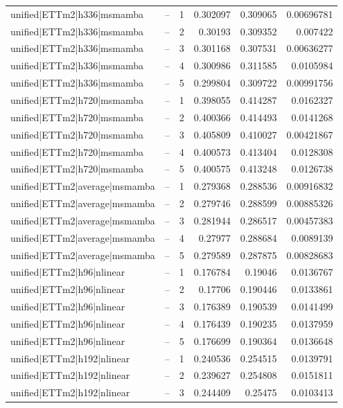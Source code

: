 \begin{longtable}{llrrrr}
unified|ETTm2|h336|msmamba & -- & 1 & 0.302097 & 0.309065 & 0.00696781 \\
unified|ETTm2|h336|msmamba & -- & 2 & 0.30193 & 0.309352 & 0.007422 \\
unified|ETTm2|h336|msmamba & -- & 3 & 0.301168 & 0.307531 & 0.00636277 \\
unified|ETTm2|h336|msmamba & -- & 4 & 0.300986 & 0.311585 & 0.0105984 \\
unified|ETTm2|h336|msmamba & -- & 5 & 0.299804 & 0.309722 & 0.00991756 \\
unified|ETTm2|h720|msmamba & -- & 1 & 0.398055 & 0.414287 & 0.0162327 \\
unified|ETTm2|h720|msmamba & -- & 2 & 0.400366 & 0.414493 & 0.0141268 \\
unified|ETTm2|h720|msmamba & -- & 3 & 0.405809 & 0.410027 & 0.00421867 \\
unified|ETTm2|h720|msmamba & -- & 4 & 0.400573 & 0.413404 & 0.0128308 \\
unified|ETTm2|h720|msmamba & -- & 5 & 0.400575 & 0.413248 & 0.0126738 \\
unified|ETTm2|average|msmamba & -- & 1 & 0.279368 & 0.288536 & 0.00916832 \\
unified|ETTm2|average|msmamba & -- & 2 & 0.279746 & 0.288599 & 0.00885326 \\
unified|ETTm2|average|msmamba & -- & 3 & 0.281944 & 0.286517 & 0.00457383 \\
unified|ETTm2|average|msmamba & -- & 4 & 0.27977 & 0.288684 & 0.0089139 \\
unified|ETTm2|average|msmamba & -- & 5 & 0.279589 & 0.287875 & 0.00828683 \\
unified|ETTm2|h96|nlinear & -- & 1 & 0.176784 & 0.19046 & 0.0136767 \\
unified|ETTm2|h96|nlinear & -- & 2 & 0.17706 & 0.190446 & 0.0133861 \\
unified|ETTm2|h96|nlinear & -- & 3 & 0.176389 & 0.190539 & 0.0141499 \\
unified|ETTm2|h96|nlinear & -- & 4 & 0.176439 & 0.190235 & 0.0137959 \\
unified|ETTm2|h96|nlinear & -- & 5 & 0.176699 & 0.190364 & 0.0136648 \\
unified|ETTm2|h192|nlinear & -- & 1 & 0.240536 & 0.254515 & 0.0139791 \\
unified|ETTm2|h192|nlinear & -- & 2 & 0.239627 & 0.254808 & 0.0151811 \\
unified|ETTm2|h192|nlinear & -- & 3 & 0.244409 & 0.25475 & 0.0103413 \\

\end{longtable}
